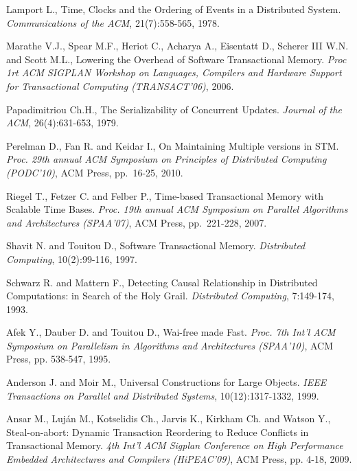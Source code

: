\begin{thebibliography}{99}
{
Lamport L., 
Time, Clocks and the Ordering of Events in a Distributed System.
{\em Communications  of the ACM}, 21(7):558-565, 1978.



Marathe  V.J.,  Spear M.F., Heriot  C., Acharya A., Eisentatt  D., Scherer
III W.N. and Scott M.L.,
Lowering the Overhead of Software Transactional Memory. 
{\it  Proc 1rt  ACM SIGPLAN  Workshop on  Languages, Compilers  and Hardware
Support for Transactional Computing (TRANSACT'06)}, 2006. 


Papadimitriou Ch.H., 
The Serializability of Concurrent Updates. 
{\it Journal of the ACM},  26(4):631-653, 1979. 


Perelman D., Fan R. and Keidar I., 
On Maintaining Multiple versions in STM. 
{\em  Proc.   29th  annual  ACM    Symposium  on Principles  of Distributed
Computing (PODC'10)}, ACM Press, pp.~16-25, 2010. 




Riegel T., Fetzer C. and Felber P.,
Time-based Transactional Memory with Scalable Time Bases.
{\em  Proc.   19th  annual  ACM   Symposium  on  Parallel   Algorithms  and
Architectures (SPAA'07)}, ACM Press, pp.~221-228, 2007.



Shavit N. and Touitou D., 
Software Transactional Memory. 
{\it Distributed  Computing}, 10(2):99-116, 1997. 

Schwarz R. and Mattern F., 
Detecting  Causal Relationship in Distributed  Computations: in  Search of
the Holy Grail. 
{\it Distributed Computing}, 7:149-174, 1993. 



Afek Y., Dauber D. and Touitou D.,
Wai-free made Fast. 
{\it Proc. 7th  Int'l  ACM Symposium on Parallelism in Algorithms 
and Architectures   (SPAA'10)},  ACM Press, pp. 538-547,  1995. 


Anderson J. and Moir M., 
Universal Constructions for Large Objects. 
{\it  IEEE Transactions on Parallel and Distributed  Systems},
10(12):1317-1332,  1999.



Ansar M.,  Luj\'an M.,  Kotselidis Ch., Jarvis K.,  Kirkham Ch. 
and  Watson Y., 
Steal-on-abort: Dynamic Transaction Reordering to
Reduce Conflicts in Transactional Memory. 
{\it 4th  Int'l ACM Sigplan Conference on  High Performance Embedded  
Architectures and Compilers (HiPEAC'09)}, ACM Press,   pp. 4-18, 2009.


}
\end{thebibliography}
